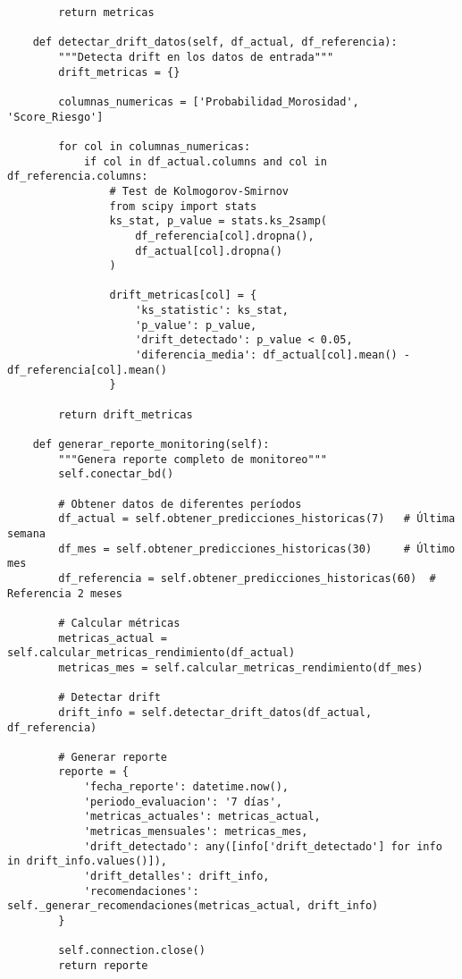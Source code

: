 \begin{verbatim}
        return metricas
    
    def detectar_drift_datos(self, df_actual, df_referencia):
        """Detecta drift en los datos de entrada"""
        drift_metricas = {}
        
        columnas_numericas = ['Probabilidad_Morosidad', 'Score_Riesgo']
        
        for col in columnas_numericas:
            if col in df_actual.columns and col in df_referencia.columns:
                # Test de Kolmogorov-Smirnov
                from scipy import stats
                ks_stat, p_value = stats.ks_2samp(
                    df_referencia[col].dropna(), 
                    df_actual[col].dropna()
                )
                
                drift_metricas[col] = {
                    'ks_statistic': ks_stat,
                    'p_value': p_value,
                    'drift_detectado': p_value < 0.05,
                    'diferencia_media': df_actual[col].mean() - df_referencia[col].mean()
                }
        
        return drift_metricas

    def generar_reporte_monitoring(self):
        """Genera reporte completo de monitoreo"""
        self.conectar_bd()
        
        # Obtener datos de diferentes períodos
        df_actual = self.obtener_predicciones_historicas(7)   # Última semana
        df_mes = self.obtener_predicciones_historicas(30)     # Último mes
        df_referencia = self.obtener_predicciones_historicas(60)  # Referencia 2 meses
        
        # Calcular métricas
        metricas_actual = self.calcular_metricas_rendimiento(df_actual)
        metricas_mes = self.calcular_metricas_rendimiento(df_mes)
        
        # Detectar drift
        drift_info = self.detectar_drift_datos(df_actual, df_referencia)
        
        # Generar reporte
        reporte = {
            'fecha_reporte': datetime.now(),
            'periodo_evaluacion': '7 días',
            'metricas_actuales': metricas_actual,
            'metricas_mensuales': metricas_mes,
            'drift_detectado': any([info['drift_detectado'] for info in drift_info.values()]),
            'drift_detalles': drift_info,
            'recomendaciones': self._generar_recomendaciones(metricas_actual, drift_info)
        }
        
        self.connection.close()
        return reporte
    

\end{verbatim}
